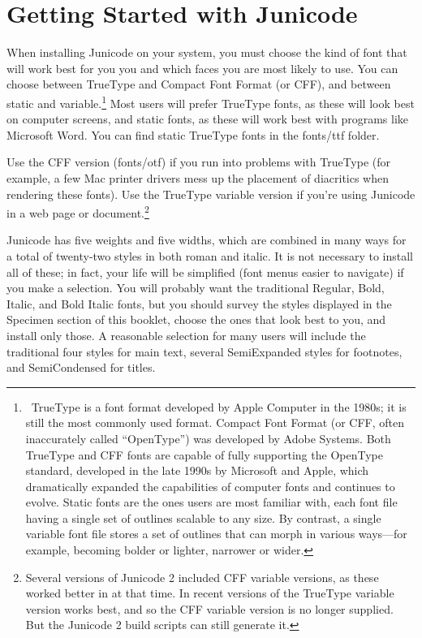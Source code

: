 
\chapter{Getting Started with Junicode}\hypertarget{GettingStarted}{}

When installing Junicode on your system, you must choose the kind of font that
will work best for you you
and which faces you are most likely to use. You can choose between TrueType
and Compact Font Format (or CFF), and between static and variable.\footnote{\ TrueType is a font format developed by
Apple Computer in the 1980s; it is still the most commonly used format. Compact Font Format
(or CFF, often inaccurately called “OpenType”) was developed by Adobe Systems.
Both TrueType and CFF fonts are capable of fully supporting the OpenType
standard, developed in the late 1990s by Microsoft and Apple, which dramatically expanded the
capabilities of computer fonts and continues to evolve. Static fonts are the ones
users are most familiar with, each font file having a single set of outlines
scalable to any size. By contrast, a single variable font file stores a set of
outlines that can morph in various ways—for example, becoming bolder or lighter,
narrower or wider.} Most users will prefer TrueType fonts, as
these will look best on computer screens, and static fonts, as these will work
best with programs like Microsoft Word. You can find static TrueType fonts in
the fonts/ttf folder.

Use the CFF version (fonts/otf) if you run into problems with TrueType (for example,
a few Mac printer drivers mess up the placement of diacritics when rendering
these fonts). Use the TrueType variable version if you're using Junicode in a
web page or {\ltech} document.\footnote{Several versions of Junicode 2
included CFF variable versions, as these worked better in {\ltech} at that
time. In recent versions of {\ltech} the TrueType variable version works best,
and so the CFF variable version is no longer supplied. But the Junicode 2
build scripts can still generate it.}

Junicode has five weights and five widths, which are combined in many ways
for a total of twenty-two styles in
both roman and italic. It is not necessary to install all of these; in fact,
your life will be simplified (font menus easier to navigate) if you
make a selection. You will probably want the traditional Regular, Bold, Italic, and Bold
Italic fonts, but you should survey the styles displayed in the Specimen
section of this booklet, choose the ones that look best to you, and install
only those. A reasonable selection for many users will include the traditional four
styles for main text, several SemiExpanded styles for footnotes, and
SemiCondensed for titles.

